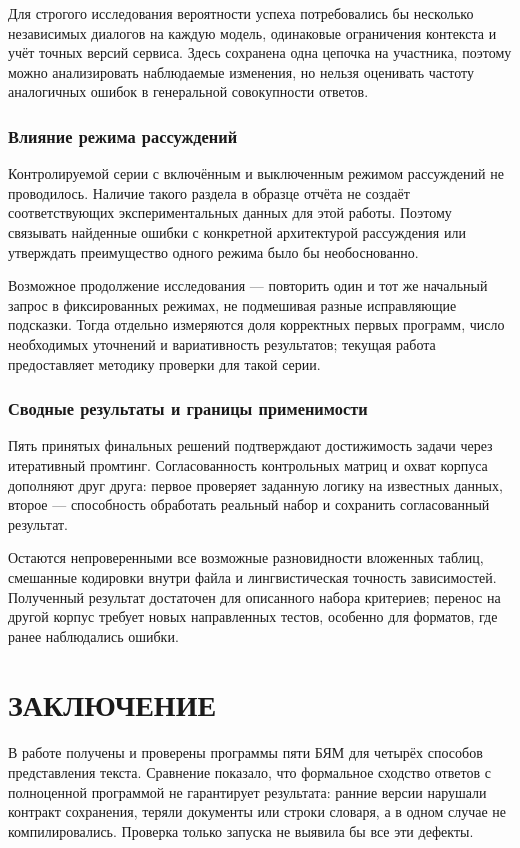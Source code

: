Для строгого исследования вероятности успеха потребовались бы несколько независимых диалогов на каждую модель, одинаковые ограничения контекста и учёт точных версий сервиса. Здесь сохранена одна цепочка на участника, поэтому можно анализировать наблюдаемые изменения, но нельзя оценивать частоту аналогичных ошибок в генеральной совокупности ответов.

\subsection{Влияние режима рассуждений}
Контролируемой серии с включённым и выключенным режимом рассуждений не проводилось. Наличие такого раздела в образце отчёта не создаёт соответствующих экспериментальных данных для этой работы. Поэтому связывать найденные ошибки с конкретной архитектурой рассуждения или утверждать преимущество одного режима было бы необоснованно.

Возможное продолжение исследования — повторить один и тот же начальный запрос в фиксированных режимах, не подмешивая разные исправляющие подсказки. Тогда отдельно измеряются доля корректных первых программ, число необходимых уточнений и вариативность результатов; текущая работа предоставляет методику проверки для такой серии.

\subsection{Сводные результаты и границы применимости}
Пять принятых финальных решений подтверждают достижимость задачи через итеративный промтинг. Согласованность контрольных матриц и охват корпуса дополняют друг друга: первое проверяет заданную логику на известных данных, второе — способность обработать реальный набор и сохранить согласованный результат.

Остаются непроверенными все возможные разновидности вложенных таблиц, смешанные кодировки внутри файла и лингвистическая точность зависимостей. Полученный результат достаточен для описанного набора критериев; перенос на другой корпус требует новых направленных тестов, особенно для форматов, где ранее наблюдались ошибки.

\chapter*{ЗАКЛЮЧЕНИЕ}
В работе получены и проверены программы пяти БЯМ для четырёх способов представления текста. Сравнение показало, что формальное сходство ответов с полноценной программой не гарантирует результата: ранние версии нарушали контракт сохранения, теряли документы или строки словаря, а в одном случае не компилировались. Проверка только запуска не выявила бы все эти дефекты.

